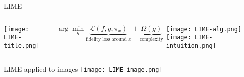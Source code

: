\documentclass[aspectratio=169]{beamer}
\begin{document}
\begin{frame}{LIME}
\begin{columns}
	 \centering
	\texttt{[image: LIME-title.png]}
	
	{\color{UWRed}
	\[
	\arg \min_g \underbrace{ \mathcal L ( f, g, \pi_x ) }_{\text{fidelity loss around }x} + \underbrace{ \Omega( g ) }_\text{complexity}
	\]}
	
	\texttt{[image: LIME-alg.png]}
	 \centering
	\texttt{[image: LIME-intuition.png]}
\end{columns}
\end{frame}


\begin{frame}{LIME applied to images}
\texttt{[image: LIME-image.png]}
\end{frame}
\end{document}
